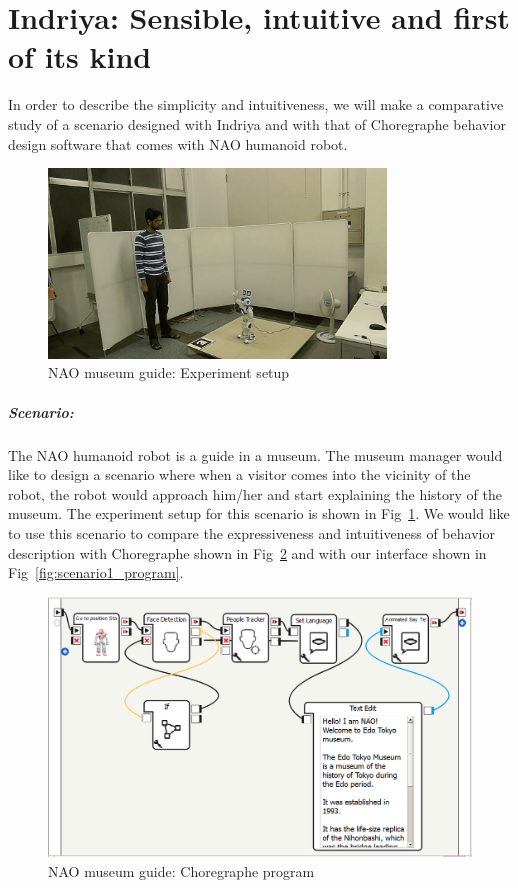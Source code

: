 \section{Indriya: Sensible, intuitive and first of its kind}
In order to describe the simplicity and intuitiveness, we will make a comparative study of a scenario designed with Indriya and with that of Choregraphe behavior design software that comes with NAO humanoid robot. 
\begin{figure}[H]
\centering
\includegraphics[width=0.8\textwidth]{../thesis/assets/scenario_museum.png}
\caption[NAO museum guide: Experiment setup]{NAO museum guide: Experiment setup}
\label{fig:scenario1_setup}
\end{figure}
\subparagraph{Scenario:}The NAO humanoid robot is a guide in a museum. The museum manager would like to design a scenario where when a visitor comes into the vicinity of the robot, the robot would approach him/her and start explaining the history of the museum. The experiment setup for this scenario is shown in Fig~\ref{fig:scenario1_setup}. We would like to use this scenario to compare the expressiveness and intuitiveness of behavior description with Choregraphe \cite{NaoRobot} shown in Fig~\ref{fig:scenario1_program_choregraphe} and with our interface shown in Fig~\ref{fig:scenario1_program}.
\begin{figure}[H]
\centering
\includegraphics[width=\textwidth]{../thesis/assets/scenario_museum_choregraphe2.png}
\caption[NAO museum guide: Choregraphe program]{NAO museum guide: Choregraphe program}
\label{fig:scenario1_program_choregraphe}
\end{figure}
